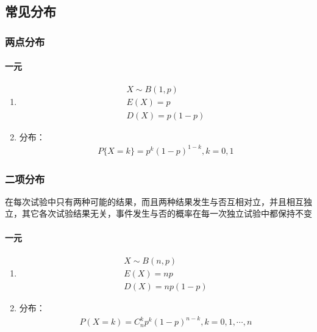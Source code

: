 \documentclass[12pt]{book}
\begin{document}
\subsection{常见分布}



\subsubsection{两点分布}



\paragraph{一元}

\begin{enumerate}[1.]
    \item
          \begin{gather*}
              X\sim B(1,p) \\
              E(X) = p \\
              D(X) = p(1-p)
          \end{gather*}
    \item 分布：
          \begin{gather*}
              P\{X=k\} = p^{k} (1-p)^{1-k}, k=0,1
          \end{gather*}
\end{enumerate}



\subsubsection{二项分布}

在每次试验中只有两种可能的结果，而且两种结果发生与否互相对立，并且相互独立，其它各次试验结果无关，事件发生与否的概率在每一次独立试验中都保持不变

\paragraph{一元}

\begin{enumerate}[1.]
    \item
          \begin{gather*}
              X\sim B(n,p) \\
              E(X)=np \\
              D(X)=np(1-p)
          \end{gather*}
    \item 分布：
          \begin{gather*}
              P(X=k)= C_{n}^{k} p^{k} (1-p)^{n-k}, k=0,1,\cdots,n
          \end{gather*}
\end{enumerate}
\end{document}
